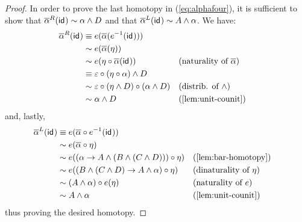 \documentclass{article}
\newcommand{\smsh}{\wedge}
\renewcommand{\epsilon}{\varepsilon}
\renewcommand{\o}{\ensuremath{\circ}}
\newcommand{\sy}{^{-1}}
\newcommand{\alphabar}{\overline{\alpha}}
\begin{document}
\begin{proof}
	In order to prove the last homotopy in (\ref{eq:alphafour}), it is sufficient to show that $\alphabar^R(\idfunc) \sim \alpha \smsh D$ and that $\alphabar^L(\idfunc) \sim A \smsh \alpha$. We have:
	\begin{align*}
		\alphabar^R(\idfunc)
		&\judgeq e(\alphabar (e\sy(\idfunc)))\\
		&\sim e (\alphabar (\eta))\\
		&\sim e (\eta \o \alphabar(\idfunc)) &&\text{(naturality of $\alphabar$)}\\
		&\judgeq \epsilon \o (\eta \o \alpha) \smsh D\\
		&\sim \epsilon \o (\eta \smsh D) \o (\alpha \smsh D) &&\text{(distrib. of $\smsh$)}\\
		&\sim \alpha \smsh D &&\text{(\autoref{lem:unit-counit})}
	\end{align*}
	and, lastly,
	\begin{align*}
		\alphabar^L(\idfunc)
		&\judgeq e(\alphabar \o e\sy(\idfunc))\\
		&\sim e(\alphabar \o \eta)\\
		&\sim e((\alpha \to A \smsh (B \smsh (C \smsh D))) \o \eta) &&\text{(\autoref{lem:bar-homotopy})}\\
		&\sim e((B \smsh (C \smsh D) \to A \smsh \alpha) \o \eta) &&\text{(dinaturality of $\eta$)}\\
		&\sim (A \smsh \alpha) \o e(\eta) &&\text{(naturality of $e$)}\\
		&\sim A \smsh \alpha &&\text{(\autoref{lem:unit-counit})}
	\end{align*}
	thus proving the desired homotopy.
\end{proof}
\end{document}
